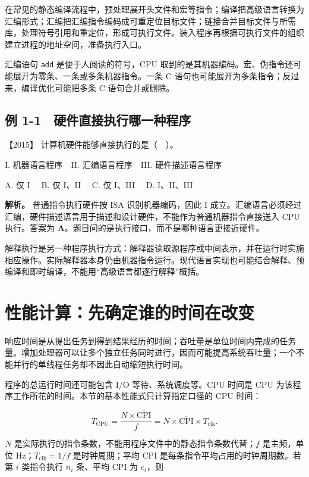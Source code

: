 在常见的静态编译流程中，预处理展开头文件和宏等指令；编译把高级语言转换为汇编形式；汇编把汇编指令编码成可重定位目标文件；链接合并目标文件与所需库，处理符号引用和重定位，形成可执行文件。装入程序再根据可执行文件的组织建立进程的地址空间，准备执行入口。

汇编语句 \texttt{add} 是便于人阅读的符号，CPU 取到的是其机器编码。宏、伪指令还可能展开为零条、一条或多条机器指令。一条 C 语句也可能展开为多条指令；反过来，编译优化可能把多条 C 语句合并或删除。

\subsection{例 1-1　硬件直接执行哪一种程序}\label{co-ex1-1}

\noindent{}【2015】 计算机硬件能够直接执行的是（　）。

I. 机器语言程序　II. 汇编语言程序　III. 硬件描述语言程序

A. 仅 I　 B. 仅 I、II　 C. 仅 I、III　 D. I、II、III


\textbf{解析。} 普通指令执行硬件按 ISA 识别机器编码，因此 I 成立。汇编语言必须经过汇编，硬件描述语言用于描述和设计硬件，不能作为普通机器指令直接送入 CPU 执行。答案为 \textbf{A}。题目问的是执行接口，而不是哪种语言更接近硬件。

解释执行是另一种程序执行方式：解释器读取源程序或中间表示，并在运行时实施相应操作。实际解释器本身仍由机器指令运行。现代语言实现也可能结合解释、预编译和即时编译，不能用``高级语言都逐行解释''概括。

\section{性能计算：先确定谁的时间在改变}\label{co-01-03}

响应时间是从提出任务到得到结果经历的时间；吞吐量是单位时间内完成的任务量。增加处理器可以让多个独立任务同时进行，因而可能提高系统吞吐量；一个不能并行的单线程任务却不因此自动缩短执行时间。

程序的总运行时间还可能包含 I/O 等待、系统调度等。CPU 时间是 CPU 为该程序工作所花的时间。本节的基本性能式只计算指定口径的 CPU 时间：

\[
T_{\mathrm{CPU}}=\frac{N\times\overline{\mathrm{CPI}}}{f}
=N\times\overline{\mathrm{CPI}}\times T_{\mathrm{clk}}.
\]

\(N\) 是实际执行的指令条数，不能用程序文件中的静态指令条数代替；\(f\) 是主频，单位 Hz；\(T_{\mathrm{clk}}=1/f\) 是时钟周期；平均 CPI 是每条指令平均占用的时钟周期数。若第 \(i\) 类指令执行 \(n_i\) 条、平均 CPI 为 \(c_i\)，则


